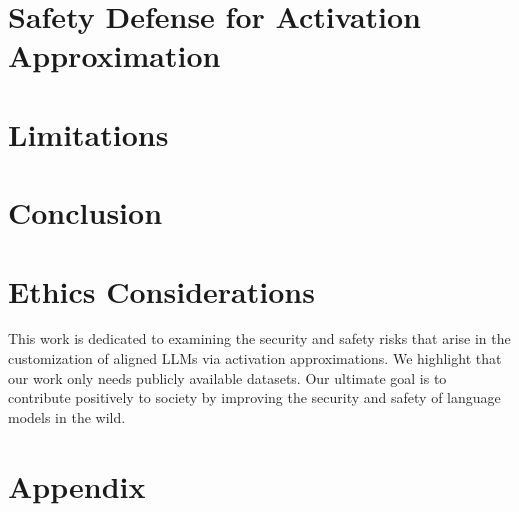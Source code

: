 \documentclass[letterpaper,twocolumn,10pt]{article}
\newcommand{\inputsection}[1]{%
   \def\sectionfolder{sections/}%
}
\begin{document}
\section{Safety Defense for Activation Approximation}
\label{sec:defense}
\inputsection{section_4}


\section{Limitations}
\inputsection{section_5}

\section{Conclusion}
\inputsection{section_6}




\section*{Ethics Considerations}
This work is dedicated to examining the security and safety risks that arise in the customization of aligned LLMs via
activation approximations. We highlight that our work only needs publicly available datasets. Our ultimate goal is to contribute positively to society by improving the security and safety of language models in the wild.






\appendix
\section{Appendix}
\inputsection{appendix}
\end{document}
